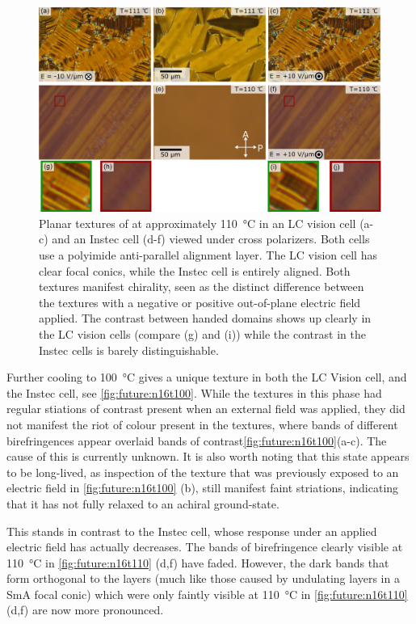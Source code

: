 \documentclass[aagreenthesis]{subfiles}
\begin{document}
\begin{figure}[h!]
    \centering
    \includegraphics[width=\textwidth]{figs/pal30/future/LCvIn110.png}
    \caption{\label{fig:future:n16t110}  Planar textures of \nsix{} at
        approximately \SI{110}{\degreeCelsius} in an LC vision cell
    (a-c) and an Instec cell (d-f) viewed under cross polarizers. Both cells use a polyimide anti-parallel
alignment layer. The LC vision cell has clear focal conics, while the Instec
cell is entirely aligned. Both textures manifest chirality, seen as the distinct
difference between the textures with a negative or positive out-of-plane
electric field applied. The contrast between handed domains shows up clearly in
the LC vision cells (compare (g) and (i)) while the contrast in the Instec cells
is barely distinguishable. }
\end{figure}

Further cooling to \SI{100}{\degreeCelsius} gives a unique texture in both the
LC Vision cell, and the Instec cell, see \autoref{fig:future:n16t100}. While the \nfour{} textures in this phase
had regular stiations of contrast present when an external field was applied,
they did not manifest the riot of colour present in the \nsix{} textures, where
bands of different birefringences appear overlaid bands of
contrast\autoref{fig:future:n16t100}(a-c). The cause
of this is currently unknown. It is also worth noting that this state appears to
be long-lived, as inspection of the texture that was previously exposed to an
electric field in \autoref{fig:future:n16t100} (b), still manifest faint
striations, indicating that it has not fully relaxed to an achiral ground-state.  

This stands in contrast to the Instec cell, whose response under an applied
electric field has actually decreases. The bands of birefringence clearly
visible at \SI{110}{\degreeCelsius} in \autoref{fig:future:n16t110} (d,f) have
faded. However, the dark bands that form orthogonal to the layers (much like
those caused by
undulating layers in a SmA focal conic) which were only faintly visible at
\SI{110}{\degreeCelsius} in \autoref{fig:future:n16t110} (d,f) are now more
pronounced.
\end{document}
